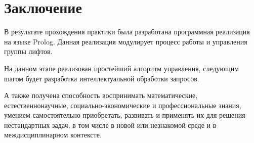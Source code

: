 \newpage
\section{Заключение}
	В результате прохождения практики была разработана программная реализация на языке Prolog.
	Данная реализация модулирует процесс работы и управления группы лифтов.

	На данном этапе реализован простейший алгоритм управления, следующим шагом будет
	разработка интеллектуальной обработки запросов.

	А также получена способность воспринимать математические, естественнонаучные, социально-экономические и профессиональные знания, умением самостоятельно приобретать, развивать и применять их для решения нестандартных задач, в том числе в новой или незнакомой среде и в междисциплинарном контексте.
